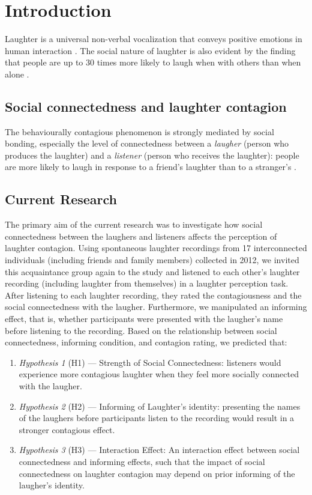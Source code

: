 \section{Introduction}

Laughter is a universal non-verbal vocalization that conveys positive emotions in human interaction \citep {sauter2010cross, scott2014social}.  The social nature of laughter is also evident by the finding that people are up to 30 times more likely to laugh when with others than when alone \citep{provine1989laughing}.

\subsection{Social connectedness and laughter contagion}
The behaviourally contagious phenomenon is strongly mediated by social bonding, especially the level of connectedness between a \textit{laugher} (person who produces the laughter) and a \textit{listener} (person who receives the laughter): people are more likely to laugh in response to a friend's laughter than to a stranger's \citep{smoski2003antiphonal}.

\subsection{Current Research}

The primary aim of the current research was to investigate how social connectedness between the laughers and listeners affects the perception of laughter contagion. Using spontaneous laughter recordings from 17 interconnected individuals (including friends and family members) collected in 2012, we invited this acquaintance group again to the study and listened to each other’s laughter recording (including laughter from themselves) in a laughter perception task. After listening to each laughter recording, they rated the contagiousness and the social connectedness with the laugher. Furthermore, we manipulated an informing effect, that is, whether participants were presented with the laugher’s name before listening to the recording. Based on the relationship between social connectedness, informing condition, and contagion rating, we predicted that:

\begin{enumerate}
    \item  \textit{Hypothesis 1} (H1) — Strength of Social Connectedness: listeners would experience more contagious laughter when they feel more socially connected with the laugher. 
    \item  \textit{Hypothesis 2}  (H2) — Informing of Laughter’s identity: presenting the names of the laughers before participants listen to the recording would result in a stronger contagious effect.
    \item  \textit{Hypothesis 3}  (H3) — Interaction Effect: An interaction effect between social connectedness and informing effects, such that the impact of social connectedness on laughter contagion may depend on prior informing of the laugher’s identity.
\end{enumerate}
